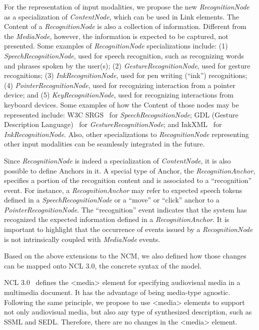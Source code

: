 For the representation of input modalities, we propose the new
\textit{RecognitionNode}
as a specialization of \textit{ContentNode}, which can be used in Link
elements. The Content of a \textit{RecognitionNode} is also a collection of
information. Different from the \textit{MediaNode}, however, the information is
expected to be captured, not presented. Some examples of
\textit{RecognitionNode} specializations include: (1)
\textit{SpeechRecognitionNode}, used for speech recognition, such as
recognizing words
and phrases spoken by the user(s); (2) \textit{GestureRecognitionNode}, used
for gesture
recognitions; (3) \textit{InkRecognitionNode}, used for pen writing (“ink”)
recognitions; (4) \textit{PointerRecognitionNode}, used for recognizing
interaction from
a pointer device; and (5) \textit{KeyRecognitionNode}, used for recognizing
interactions
from keyboard devices. Some examples of how the Content of those nodes may be
represented include: W3C SRGS~\cite{andrew_hunt_speech_2004} for \textit{SpeechRecognitionNode}; GDL
(Gesture
Description Language)~\cite{hachaj_semantic_2012} for
\textit{GestureRecognitionNode}; and InkXML~\cite{w3c_ink_2011} for
\textit{InkRecognitionNode}. Also, other specializations to
\textit{RecognitionNode} representing
other input modalities can be seamlessly integrated in the future.

Since \textit{RecognitionNode} is indeed a specialization of
\textit{ContentNode}, it is also
possible to define Anchors in it. A special type of Anchor, the
\textit{RecognitionAnchor}, specifies a portion of the recognition content and
is
associated to a “recognition” event. For instance, a \textit{RecognitionAnchor}
may refer to expected speech tokens defined in a \textit{SpeechRecognitionNode}
or
a “move” or “click” anchor to a \textit{PointerRecognitionNode}. The
“recognition” event indicates that the system has recognized the expected
information defined in a \textit{RecognitionAnchor}. It is important to
highlight that the occurrence of events issued by a \textit{RecognitionNode} is
not intrinsically coupled with \textit{MediaNode} events.

Based on the above extensions to the NCM, we also defined how those changes
can be mapped onto NCL 3.0, the concrete syntax of the model.

NCL 3.0~\cite{abnt_abnt_2016} defines the <media> element for
specifying audiovisual media in a
multimedia document. It has the advantage of being media-type agnostic.
Following the same principle, we propose to use <media> elements to support not
only audiovisual media, but also any type of synthesized description, such as
SSML and SEDL. Therefore, there are no changes in the <media> element.

